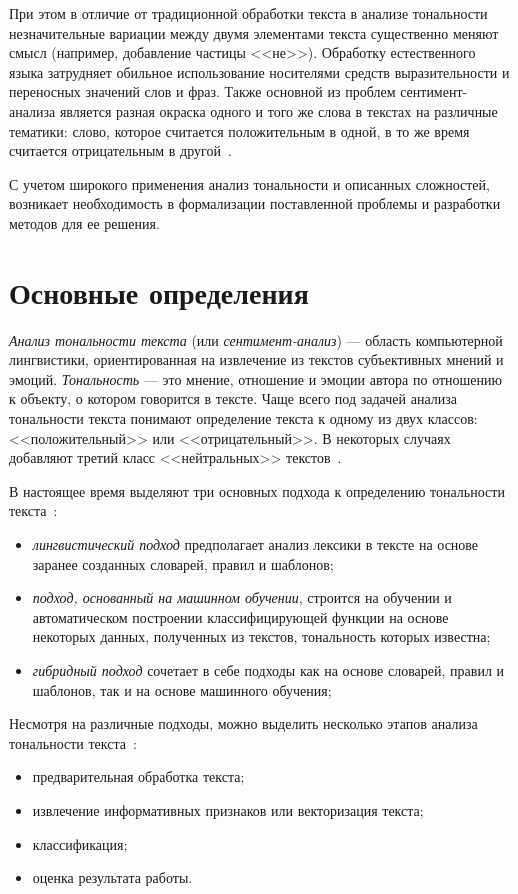 При этом в отличие от традиционной обработки текста в анализе тональности
незначительные вариации между двумя элементами текста существенно меняют смысл
(например, добавление частицы <<не>>). Обработку естественного языка затрудняет
обильное использование носителями средств выразительности и переносных значений
слов и фраз. Также основной из проблем сентимент-анализа является разная окраска
одного и того же слова в текстах на различные тематики: слово, которое считается
положительным в одной, в то же время считается отрицательным в
другой~\cite{article03}.

С учетом широкого применения анализ тональности и описанных сложностей,
возникает необходимость в формализации поставленной проблемы и разработки
методов для ее решения.

\section{Основные определения}

\textit{Анализ тональности текста} (или \textit{сентимент-анализ}) --- область
компьютерной лингвистики, ориентированная на извлечение из текстов субъективных
мнений и эмоций. \textit{Тональность} --- это мнение, отношение и эмоции автора
по отношению к объекту, о котором говорится в тексте. Чаще всего под задачей
анализа тональности текста понимают определение текста к одному из двух классов:
<<положительный>> или <<отрицательный>>. В некоторых случаях добавляют третий
класс <<нейтральных>> текстов~\cite{article05}.

В настоящее время выделяют три основных подхода к определению тональности
текста~\cite{article05}:
\begin{itemize}
    \item \textit{лингвистический подход} предполагает анализ лексики в тексте на
        основе заранее созданных словарей, правил и шаблонов;

    \item \textit{подход, основанный на машинном обучении}, строится на обучении и
        автоматическом построении классифицирующей функции на основе
        некоторых данных, полученных из текстов, тональность которых
        известна;

    \item \textit{гибридный подход} сочетает в себе подходы как на основе
        словарей, правил и шаблонов, так и на основе машинного обучения;
\end{itemize}


Несмотря на различные подходы, можно выделить несколько этапов анализа
тональности текста~\cite{article09}:
\begin{itemize}
    \item предварительная обработка текста;
    \item извлечение информативных признаков или векторизация текста;
    \item классификация;
    \item оценка результата работы.
\end{itemize}

